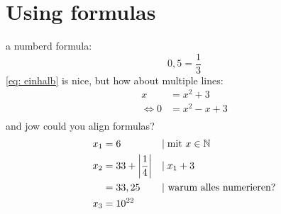 \documentclass[	%
		11pt,a4paper,	%
		twoside,		%
		english,		%
		f1				%
	]{HsH-report}		%
\begin{document}
\chapter{Using formulas}
	\label{chap: theorie}
	a numberd formula:
	\begin{equation}
		\label{eq: einhalb} %
		0,5=\frac{1}{3}
	\end{equation}
	\autoref{eq: einhalb} is nice, but how about multiple lines:
	\begin{equation}
	\begin{split} %
		x &= x^2+3 \\
		\Leftrightarrow 0 &= x^2-x+3 \\
	\end{split}
	\end{equation}
	and jow could you align formulas?
	\begin{align}
		x_1 &= 6 &&|\;\mbox{mit } x \in \mathbb{N} \\
		x_2 &= 33+\left\vert\frac{1}{4}\right\vert &&|\;x_1+3 \\
			&= 33,25 &&\mbox{| warum alles numerieren?} \notag \\
		x_3 &= 10^{22}
	\end{align}


\printbibliography
\listoffigures
\end{document}
